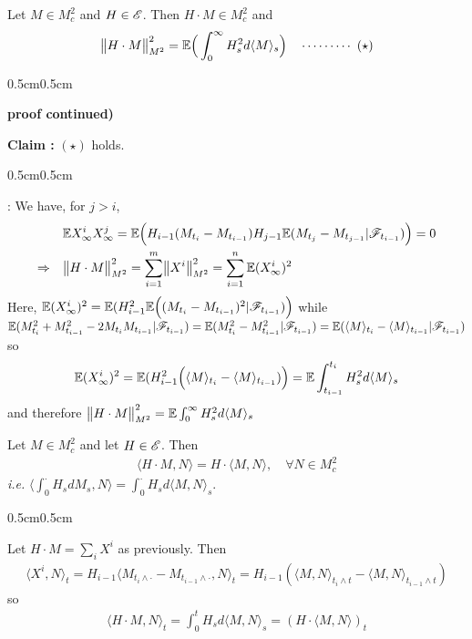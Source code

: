 \documentclass[12pt,a4paper]{article}
\newenvironment{proof}
{\begin{changemargin}{0.5cm}{0.5cm} 
	}%
	{\end{changemargin}
}
\newenvironment{subproof}
{\begin{changemargin}{0.5cm}{0.5cm} 
	}%
	{\end{changemargin}
}
\newenvironment{p}
{\begin{proof} 
	}%
	{\end{proof}
}
\begin{document}
\prop Let $M\in M_c^2$ and $H\in \mathscr{E}$. Then $H\cdot M \in M_c^2$ and
\begin{align*}
\bigl\lVert H\cdot M\bigr\rVert_{M^2}^2 = \mathbb{E} \Big( \int_0^{\infty} H_s^2 d\langle M\rangle_s \Big) \quad \cdots\cdots\cdots\,\,(\star)
\end{align*}
\begin{p}
\textbf{proof continued)}

\textbf{Claim :} $(\star)$ holds.
\begin{subproof}
: We have, for $j>i$,
\begin{align*}
& \mathbb{E} X_{\infty}^i X_{\infty}^j = \mathbb{E} \Big(H_{i-1} (M_{t_i}- M_{t_{i-1}}) H_{j-1} \mathbb{E} (M_{t_j}- M_{t_{j-1}} | \mathscr{F}_{t_{i-1}}) \Big) =0 \\
\Rightarrow \quad &\bigl\lVert H\cdot M\bigr\rVert_{M^2}^2 = \sum_{i=1}^m \bigl\lVert X^i\bigr\rVert_{M^2}^2 = \sum_{i=1}^n \mathbb{E} (X_{\infty}^i)^2
\end{align*}
Here, $\mathbb{E} (X_{\infty}^i)^2 = \mathbb{E}(H_{i-1}^2 \mathbb{E} \Big( (M_{t_i} - M_{t_{i-1}})^2 | \mathscr{F}_{t_{i-1}} )\Big)$ while $\mathbb{E}(M_{t_i}^2 + M_{t_{i-1}}^2 - 2M_{t_i}M_{t_{i-1}} |\mathscr{F}_{t_{i-1}}) = \mathbb{E}(M_{t_i}^2 - M_{t_{i-1}}^2 | \mathscr{F}_{t_{i-1}}) = \mathbb{E} (\langle M \rangle_{t_i} - \langle M \rangle_{t_{i-1}} |\mathscr{F}_{t_{i-1}} )$ so
\begin{align*}
\mathbb{E} (X_{\infty}^i)^2 = \mathbb{E}(H_{i-1}^2 \Big(\langle M \rangle_{t_i} - \langle M \rangle_{t_{i-1}}) \Big) = \mathbb{E} \int_{t_{i-1}}^{t_i} H_s^2 d\langle M \rangle_s
\end{align*}
and therefore $\bigl\lVert H\cdot M\bigr\rVert_{M^2}^2 = \mathbb{E} \int_0^{\infty} H_s^2 d\langle M \rangle_s$
\end{subproof}
\eop
\end{p}
\s

\prop Let $M\in M_c^2$ and let $H\in \mathscr{E}$. Then
\begin{align*}
\langle H\cdot M, N \rangle = H \cdot \langle M, N \rangle, \quad \forall N \in M_c^2
\end{align*}
\textit{i.e.} $\langle \int_0^{\cdot} H_s dM_s, N\rangle = \int_0^{\cdot} H_s d\langle M, N \rangle_s$.
\begin{p}
\pf Let $H\cdot M =\sum_i X^i$ as previously. Then
\begin{align*}
\langle X^i, N \rangle_t = H_{i-1} \langle M_{t_i \wedge \cdot} - M_{t_{i-1}\wedge \cdot}, N \rangle_t = H_{i-1} (\langle M, N \rangle_{t_i \wedge t} - \langle M, N\rangle_{t_{i-1}\wedge t})
\end{align*}
so
\begin{align*}
\langle H\cdot M, N \rangle_t = \int_0^t H_s d\langle M, N \rangle_s = (H\cdot \langle M, N \rangle)_t
\end{align*}
\eop
\end{p}
\end{document}
